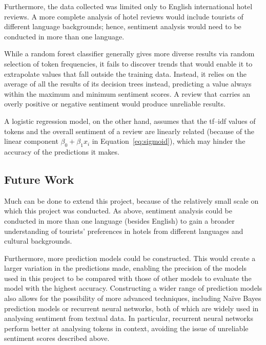 \documentclass[12pt, a4paper]{pancake-article}
\begin{document}
Furthermore, the data collected was limited only to English international hotel reviews.
A more complete analysis of hotel reviews would include tourists of different language
backgrounds; hence, sentiment analysis would need to be conducted in more than one language.

While a random forest classifier generally gives more diverse results via random
selection of token frequencies, it fails to discover trends that would enable it to extrapolate
values that fall outside the training data. Instead, it relies on the average of all the results
of its decision trees instead, predicting a value always within the maximum and minimum sentiment scores.
A review that carries an overly positive or negative sentiment would produce unreliable results.

A logistic regression model, on the other hand, assumes that the tf--idf values of tokens
and the overall sentiment of a review are linearly related (because of the linear component $\beta_0 + \beta_1x_i$
in Equation~\ref{eq:sigmoid}), which may hinder the accuracy of the predictions it makes.

\subsection{Future Work}

Much can be done to extend this project, because of the relatively small scale on which this project
was conducted. As above, sentiment analysis could be conducted in more than one language (besides English)
to gain a broader understanding of tourists' preferences in hotels from different languages and cultural
backgrounds.

Furthermore, more prediction models could be constructed. This would create a larger
variation in the predictions made, enabling the precision of the models used in this project to be
compared with those of other models to evaluate the model with the highest accuracy. Constructing a
wider range of prediction models also allows for the possibility of more advanced techniques,
including Naïve Bayes prediction models or recurrent neural networks, both of which are
widely used in analysing sentiment from textual data. In particular, recurrent neural
networks perform better at analysing tokens in context, avoiding the issue
of unreliable sentiment scores described above.

\printbibliography[heading=bibintoc]
\end{document}
